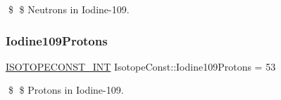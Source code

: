 \$ \$ Neutrons in Iodine-\/109. \mbox{\label{group___isotope_const-_iodine-_i109_ga5902afda0278ac1c3d2f3922f2f0ee03}} 
\subsubsection{\texorpdfstring{Iodine109\+Protons}{Iodine109Protons}}
{\footnotesize\ttfamily \mbox{\hyperlink{group___isotope_const-_macros_ga5f18360b3e99483a35c32d789e62621c}{I\+S\+O\+T\+O\+P\+E\+C\+O\+N\+S\+T\+\_\+\+I\+NT}} Isotope\+Const\+::\+Iodine109\+Protons = 53}

\$ \$ Protons in Iodine-\/109. 